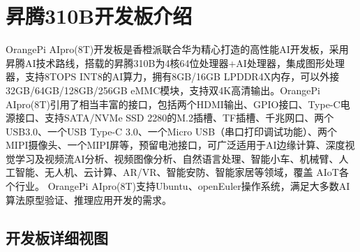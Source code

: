 \section{昇腾310B开发板介绍}\label{ux6607ux817e310bux5f00ux53d1ux677fux4ecbux7ecd}

OrangePi
AIpro(8T)开发板是香橙派联合华为精心打造的高性能AI开发板，采用昇腾AI技术路线，搭载的昇腾310B为4核64位处理器+AI处理器，集成图形处理器，支持8TOPS
INT8的AI算力，拥有8GB/16GB LPDDR4X内存，可以外接32GB/64GB/128GB/256GB
eMMC模块，支持双4K高清输出。OrangePi
AIpro(8T)引用了相当丰富的接口，包括两个HDMI输出、GPIO接口、Type-C电源接口、支持SATA/NVMe
SSD 2280的M.2插槽、TF插槽、千兆网口、两个USB3.0、一个USB Type-C
3.0、一个Micro
USB（串口打印调试功能）、两个MIPI摄像头、一个MIPI屏等，预留电池接口，可广泛适用于AI边缘计算、深度视觉学习及视频流AI分析、视频图像分析、自然语言处理、智能小车、机械臂、人工智能、无人机、云计算、AR/VR、智能安防、智能家居等领域，覆盖
AIoT各个行业。 OrangePi
AIpro(8T)支持Ubuntu、openEuler操作系统，满足大多数AI算法原型验证、推理应用开发的需求。

\subsection{开发板详细视图}\label{ux5f00ux53d1ux677fux8be6ux7ec6ux89c6ux56fe}


